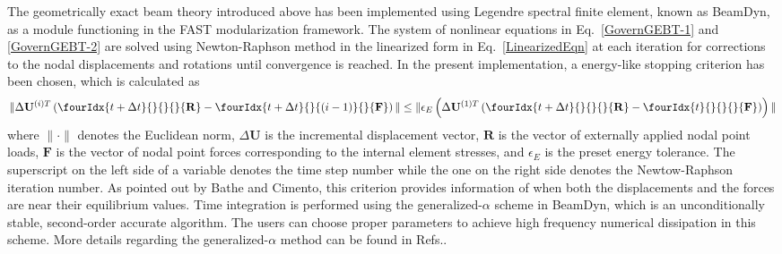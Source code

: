 The geometrically exact beam theory introduced above has been implemented using Legendre spectral finite element, known as BeamDyn, as a module functioning in the FAST modularization framework. The system of nonlinear equations in Eq.~\eqref{GovernGEBT-1} and \eqref{GovernGEBT-2} are solved using Newton-Raphson method in the linearized form in Eq.~\eqref{LinearizedEqn} at each iteration for corrections to the nodal displacements and rotations until convergence is reached. In the present implementation, a energy-like stopping criterion has been chosen, which is calculated as
\begin{equation}
    \label{StoppingCriterion}
    \| \Delta \mathbf{U}^{(i)T} \left( \fourIdx{t+\Delta t}{}{}{}{\mathbf{R}} -  \fourIdx{t+\Delta t}{}{(i-1)}{}{\mathbf{F}}  \right) \| \leq \| \epsilon_E \left( \Delta \mathbf{U}^{(1)T} \left( \fourIdx{t+\Delta t}{}{}{}{\mathbf{R}} - \fourIdx{t}{}{}{}{\mathbf{F}} \right) \right) \|
\end{equation}
where $\|\cdot\|$ denotes the Euclidean norm, $\Delta \mathbf{U}$ is the
incremental displacement vector, $\mathbf{R}$ is the vector of externally
applied nodal point loads, $\mathbf{F}$ is the vector of nodal point forces
corresponding to the internal element stresses, and $\epsilon_E$ is the
preset energy tolerance. The superscript on the left side of a variable denotes the time step number while the one on the right side denotes the Newtow-Raphson iteration number. As pointed out by Bathe and
Cimento\cite{Bathe-Cimento:1980}, this criterion provides information of
when both the displacements and the forces are near their equilibrium
values. Time integration is performed using the generalized-$\alpha$ scheme in
BeamDyn, which is an unconditionally stable, second-order accurate algorithm.
The users can choose proper parameters to achieve high frequency numerical
dissipation in this scheme. More details regarding the generalized-$\alpha$
method can be found in Refs.\cite{Chung-Hulbert:1993,Bauchau:2010}. 


